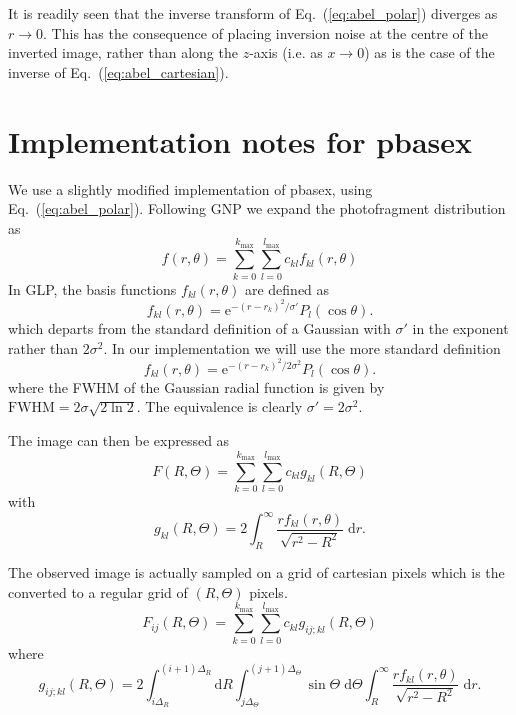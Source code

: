 \documentclass{article}
\renewcommand{\eqref}[1]{Eq.~(\ref{#1})}
\renewcommand{\exp}[1]{\ensuremath{\mathrm{e}^{#1}}}
\newcommand{\dee}{\ensuremath{\mathrm{d}}}
\begin{document}
It is readily seen that the inverse transform of \eqref{eq:abel_polar}
diverges as $r\rightarrow0$. This has the consequence of placing inversion
noise at the centre of the inverted image, rather than along the $z$-axis
(i.e. as $x\rightarrow0$) as is the case of the inverse of
\eqref{eq:abel_cartesian}.

\section{Implementation notes for pbasex}
We use a slightly modified implementation of pbasex, using
\eqref{eq:abel_polar}. Following GNP we expand the photofragment distribution
as
\begin{equation}
  f(r,\theta)=
  \sum_{k=0}^{k_\mathrm{max}}
  \sum_{l=0}^{l_\mathrm{max}}
  c_{kl}f_{kl}(r,\theta)
\end{equation}
In GLP, the basis functions $f_{kl}(r,\theta)$ are defined as
\begin{equation}
  f_{kl}(r,\theta)=
  \exp{-(r-r_k)^2/\sigma'}P_l(\cos\theta).
\end{equation}
which departs from the standard definition of a Gaussian with $\sigma'$ in the
exponent rather than $2\sigma^2$. In our implementation we will use the more
standard definition
\begin{equation}
  f_{kl}(r,\theta)=
  \exp{-(r-r_k)^2/2\sigma^2}P_l(\cos\theta).
\end{equation}
where the FWHM of the Gaussian radial function is given by
$\mathrm{FWHM}=2\sigma\sqrt{2\ln2}$. The equivalence is clearly
$\sigma'=2\sigma^2$.

The image can then be expressed as
\begin{equation}
  F(R, \Theta)=
  \sum_{k=0}^{k_\mathrm{max}}
  \sum_{l=0}^{l_\mathrm{max}}
  c_{kl}g_{kl}(R,\Theta)
\end{equation}
with
\begin{equation}
  g_{kl}(R,\Theta)=
  2\int_{R}^\infty
  \frac{rf_{kl}(r, \theta)}{\sqrt{r^2-R^2}}\;\dee r.
\end{equation}

The observed image is actually sampled on a grid of cartesian pixels which is
the converted to a regular grid of $(R, \Theta)$ pixels.
\begin{equation}
  F_{ij}(R, \Theta)=
  \sum_{k=0}^{k_\mathrm{max}}
  \sum_{l=0}^{l_\mathrm{max}}
  c_{kl}g_{ij;kl}(R,\Theta)
\end{equation}
where
\begin{equation}
  g_{ij;kl}(R,\Theta)=
  2
  \int_{i\Delta_R}^{(i+1)\Delta_R}\dee R
  \int_{j\Delta_\Theta}^{(j+1)\Delta_\Theta}\sin\Theta\;\dee \Theta
  \int_{R}^\infty
  \frac{rf_{kl}(r, \theta)}{\sqrt{r^2-R^2}}\;\dee r.
\end{equation}
\end{document}
